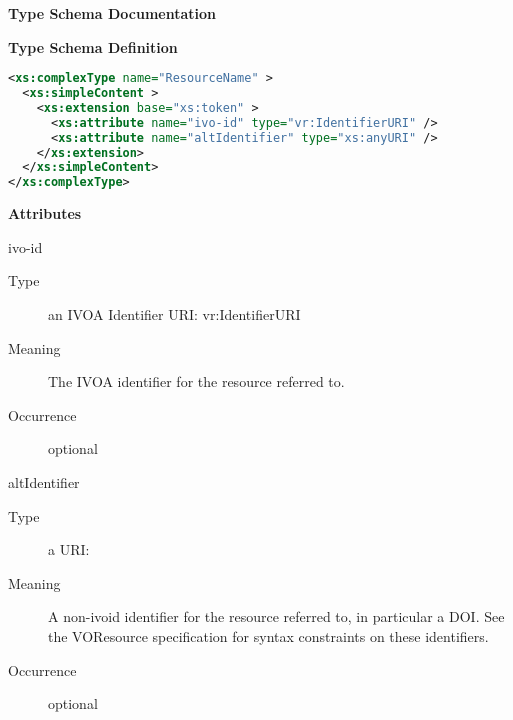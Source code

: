 \documentclass[11pt,a4paper]{ivoa}
\begin{document}
\begin{generated}
\begingroup
        \renewcommand*\descriptionlabel[1]{%
        \hbox to 5.5em{\emph{#1}\hfil}}\vspace{2ex}\noindent\textbf{ Type Schema Documentation}


\vspace{1ex}\noindent\textbf{ Type Schema Definition}

\begin{lstlisting}[language=XML,basicstyle=\footnotesize]
<xs:complexType name="ResourceName" >
  <xs:simpleContent >
    <xs:extension base="xs:token" >
      <xs:attribute name="ivo-id" type="vr:IdentifierURI" />
      <xs:attribute name="altIdentifier" type="xs:anyURI" />
    </xs:extension>
  </xs:simpleContent>
</xs:complexType>
\end{lstlisting}

\vspace{0.5ex}\noindent\textbf{ Attributes}

\begingroup\small\begin{bigdescription}
\item[ivo-id]
\begin{description}
\item[Type] an IVOA Identifier URI: vr:IdentifierURI
\item[Meaning]
                The IVOA identifier for the resource referred to.

\item[Occurrence] optional

\end{description}
\item[altIdentifier]
\begin{description}
\item[Type] a URI: 
\item[Meaning]
                A non-ivoid identifier for the resource referred to,
                in particular a DOI.  See the VOResource specification
                for syntax constraints on these identifiers.

\item[Occurrence] optional
\end{description}


\end{bigdescription}\endgroup

\endgroup
\end{generated}
\end{document}
